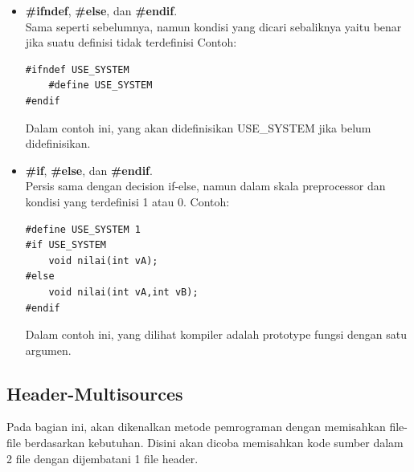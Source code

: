 \documentclass[12pt,]{article}
\begin{document}
\begin{itemize}
		\item \textbf{\#ifndef}, \textbf{\#else}, dan \textbf{\#endif}. \\
		Sama seperti sebelumnya, namun kondisi yang dicari sebaliknya yaitu benar jika suatu definisi tidak terdefinisi
		Contoh:
		\begin{verbatim}
#ifndef USE_SYSTEM
	#define USE_SYSTEM
#endif
		\end{verbatim}
		Dalam contoh ini, yang akan didefinisikan USE\_SYSTEM jika belum didefinisikan.

		\item \textbf{\#if}, \textbf{\#else}, dan \textbf{\#endif}. \\
		Persis sama dengan decision if-else, namun dalam skala preprocessor dan kondisi yang terdefinisi 1 atau 0.
		Contoh:
		\begin{verbatim}
#define USE_SYSTEM 1
#if USE_SYSTEM
	void nilai(int vA);
#else
	void nilai(int vA,int vB);
#endif
		\end{verbatim}
		Dalam contoh ini, yang dilihat kompiler adalah prototype fungsi dengan satu argumen.

	\end{itemize}


	\newpage
	\subsection{Header-Multisources}

	Pada bagian ini, akan dikenalkan metode pemrograman dengan memisahkan file-file berdasarkan kebutuhan.
	Disini akan dicoba memisahkan kode sumber dalam 2 file dengan dijembatani 1 file header.
\end{document}
